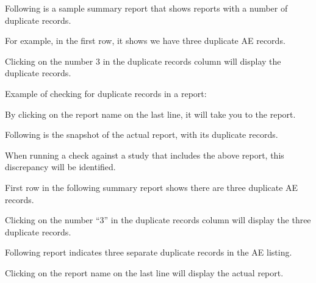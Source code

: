 \documentclass[
  letterpaper,
  DIV=11,
  numbers=noendperiod]{scrartcl}
\begin{document}
Following is a sample summary report that shows reports with a number of
duplicate records.

For example, in the first row, it shows we have three duplicate AE
records.

Clicking on the number 3 in the duplicate records column will display
the duplicate records.~~

Example of checking for duplicate records in a report:~

By clicking on the report name on the last line, it will take you to the
report.

Following is the snapshot of the actual report, with its duplicate
records.

When running a check against a study that includes the above report,
this discrepancy will be identified.~~

First row in the following summary report shows there are three
duplicate AE records.

Clicking on the number ``3'' in the duplicate records column will
display the three duplicate records.~~

Following report indicates three separate duplicate records in the AE
listing.~

Clicking on the report name on the last line will display the actual
report.
\end{document}
